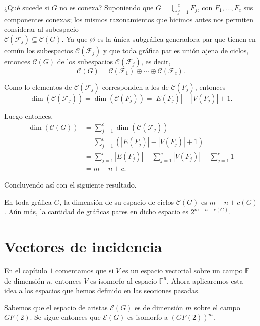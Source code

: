¿Qué sucede si $G$ no es conexa? Suponiendo que $G = \bigcup_{j=1}^{c}F_{j}$, con $F_{1}, \ldots, F_{c}$ sus componentes conexas; los mismos razonamientos que hicimos antes nos permiten considerar al subespacio \\$\mathcal{C}(\mathcal{F}_{j}) \subseteq \mathcal{C}(G)$. Ya que $\varnothing$ es la única subgráfica generadora par que tienen en común los subespacios $\mathcal{C}(\mathcal{F}_{j})$ y que toda gráfica par es unión ajena de ciclos, entonces $\mathcal{C}(G)$ de los subespacios $\mathcal{C}(\mathcal{F}_{j})$, es decir, $$\mathcal{C}(G)= \mathcal{C}(\mathcal{F}_{1}) \oplus \cdots \oplus \mathcal{C}(\mathcal{F}_{c}).$$

Como lo elementos de $\mathcal{C}(\mathcal{F}_{j})$ corresponden a los de $\mathcal{C}(F_{j})$, entonces $$\dim(\mathcal{C}(\mathcal{F}_{j})) = \dim(\mathcal{C}(F_{j})) = |E(F_{j})|-|V(F_{j})| + 1.$$

Luego entonces, 
\begin{align*}
    \dim(\mathcal{C}(G)) &= \sum_{j = 1}^{c}\dim(\mathcal{C}(\mathcal{F}_{j}))\\
    &= \sum_{j = 1}^{c} (|E(F_{j})|-|V(F_{j})| + 1) \\
    &= \sum_{j=1}^{c} |E(F_{j})| - \sum_{j=1}^{c} |V(F_{j})| + \sum_{j=1}^{c} 1\\
    &= m - n + c.
\end{align*}

Concluyendo así con el siguiente resultado.

\begin{teo}\label{teo:dimciclos}
En toda gráfica $G$, la dimensión de su espacio de ciclos $\mathcal{C}(G)$ es $m -n +c(G)$. Aún más, la cantidad de gráficas pares en dicho espacio es $2^{m-n+c(G)}$.
\end{teo}


\section{Vectores de incidencia}

En el capítulo $1$ comentamos que si $V$ es un espacio vectorial sobre un campo $\mathbb{F}$ de dimensión $n$, entonces $V$ es isomorfo al espacio $\mathbb{F}^n$. Ahora aplicaremos esta idea a los espacios que hemos definido en las secciones pasadas.

Sabemos que el espacio de aristas $\mathcal{E}(G)$ es de dimensión $m$ sobre el campo $GF(2)$. Se sigue entonces que $\mathcal{E}(G)$ es isomorfo a $(GF(2))^{m}$. 

